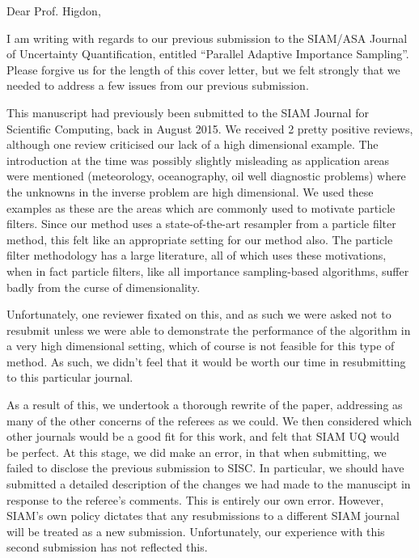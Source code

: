 \documentclass{letter}
\begin{document}
\date{}
\begin{letter}{ }

\opening{Dear Prof. Higdon,}

I am writing with regards to our previous submission to the SIAM/ASA Journal of Uncertainty Quantification, entitled ``Parallel Adaptive Importance Sampling''. Please forgive us for the length of this cover letter, but we felt strongly that we needed to address a few issues from our previous submission.

This manuscript had previously been submitted to the SIAM Journal for Scientific Computing, back in August 2015. We received 2 pretty positive reviews, although one review criticised our lack of a high dimensional example. The introduction at the time was possibly slightly misleading as application areas were mentioned (meteorology, oceanography, oil well diagnostic problems) where the unknowns in the inverse problem are high dimensional. We used these examples as these are the areas which are commonly used to motivate particle filters. Since our method uses a state-of-the-art resampler from a particle filter method, this felt like an appropriate setting for our method also. The particle filter methodology has a large literature, all of which uses these motivations, when in fact particle filters, like all importance sampling-based algorithms, suffer badly from the curse of dimensionality. 

Unfortunately, one reviewer fixated on this, and as such we were asked not to resubmit unless we were able to demonstrate the performance of the algorithm in a very high dimensional setting, which of course is not feasible for this type of method. As such, we didn't feel that it would be worth our time in resubmitting to this particular journal.

As a result of this, we undertook a thorough rewrite of the paper, addressing as many of the other concerns of the referees as we could. We then considered which other journals would be a good fit for this work, and felt that SIAM UQ would be perfect. At this stage, we did make an error, in that when submitting, we failed to disclose the previous submission to SISC. In particular, we should have submitted a detailed description of the changes we had made to the manuscipt in response to the referee's comments. This is entirely our own error. However, SIAM's own policy dictates that any resubmissions to a different SIAM journal will be treated as a new submission. Unfortunately, our experience with this second submission has not reflected this.


\end{letter}
\end{document}
